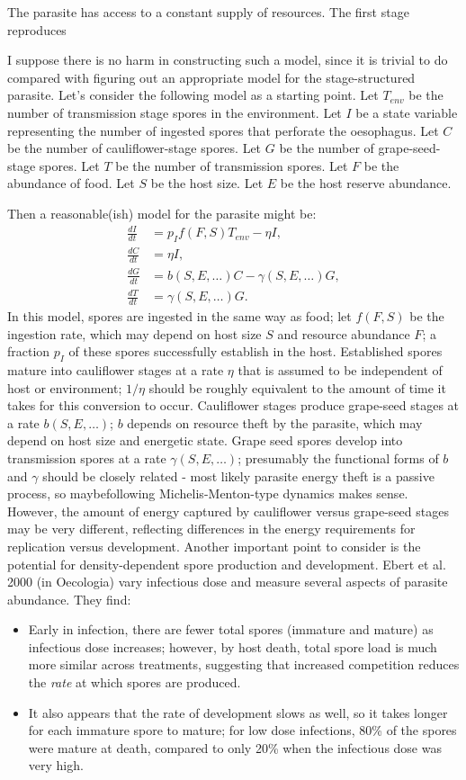 \documentclass[11pt,reqno,final,pdftex]{amsart}\usepackage[]{graphicx}\usepackage[]{color}
\theoremstyle{plain}
\numberwithin{equation}{part}
\begin{document}
The parasite has access to a constant supply of resources.
The first stage reproduces

I suppose there is no harm in constructing such a model, since it is trivial to do compared with figuring out an appropriate model for the stage-structured parasite.
Let's consider the following model as a starting point.
Let $T_{env}$ be the number of transmission stage spores in the environment.
Let $I$ be a state variable representing the number of ingested spores that perforate the oesophagus.
Let $C$ be the number of cauliflower-stage spores.
Let $G$ be the number of grape-seed-stage spores.
Let $T$ be the number of transmission spores.
Let $F$ be the abundance of food.
Let $S$ be the host size.
Let $E$ be the host reserve abundance.

Then a reasonable(ish) model for the parasite might be:
\begin{align}
\frac{dI}{dt} &= p_I f(F,S) T_{env} - \eta I, \\
\frac{dC}{dt} &= \eta I, \\
\frac{dG}{dt} &= b(S,E,\dots)C - \gamma(S,E,\dots) G, \\
\frac{dT}{dt} &= \gamma(S,E,\dots) G.
\end{align}
In this model, spores are ingested in the same way as food; let $f(F,S)$ be the ingestion rate, which may depend on host size $S$ and resource abundance $F$; a fraction $p_I$ of these spores successfully establish in the host.
Established spores mature into cauliflower stages at a rate $\eta$ that is assumed to be independent of host or environment; $1/\eta$ should be roughly equivalent to the amount of time it takes for this conversion to occur.
Cauliflower stages produce grape-seed stages at a rate $b(S,E,\dots)$; $b$ depends on resource theft by the parasite, which may depend on host size and energetic state.
Grape seed spores develop into transmission spores at a rate $\gamma(S,E,\dots)$; presumably the functional forms of $b$ and $\gamma$ should be closely related - most likely parasite energy theft is a passive process, so maybefollowing Michelis-Menton-type dynamics makes sense.
However, the amount of energy captured by cauliflower versus grape-seed stages may be very different, reflecting differences in the energy requirements for replication versus development.
Another important point to consider is the potential for density-dependent spore production and development.
Ebert et al. 2000 (in Oecologia) vary infectious dose and measure several aspects of parasite abundance.
They find:
\begin{itemize}
\item Early in infection, there are fewer total spores (immature and mature) as infectious dose increases; however, by host death, total spore load is much more similar across treatments, suggesting that increased competition reduces the \emph{rate} at which spores are produced.
\item It also appears that the rate of development slows as well, so it takes longer for each immature spore to mature; for low dose infections, 80\% of the spores were mature at death, compared to only 20\% when the infectious dose was very high.
\end{itemize}
\end{document}
